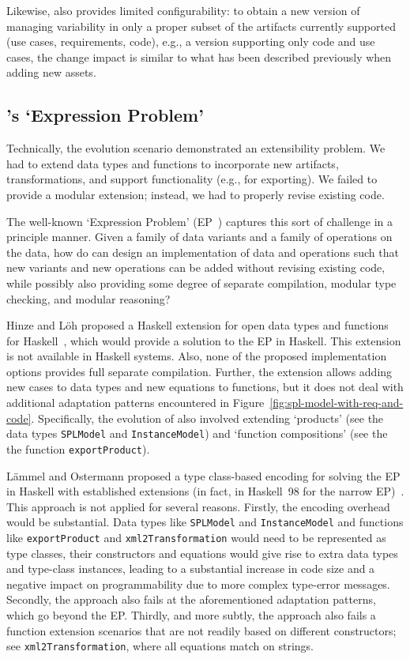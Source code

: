 Likewise, \hp{} also provides limited configurability: to obtain a new
version of \hp{} managing variability in only a proper subset of the
artifacts currently supported (use cases, requirements, code), e.g., a
version supporting only code and use cases, the change impact is
similar to what has been described previously when adding new assets.


\subsection{\hp's `Expression Problem'}
\label{S:xp}

Technically, the evolution scenario demonstrated an extensibility
problem. We had to extend data types and functions to incorporate new
artifacts, transformations, and support functionality (e.g., for
exporting). We failed to provide a modular extension; instead, we had
to properly revise existing code.

The well-known `Expression Problem'
(EP~\cite{Wadler98,Lopez-HerrejonBC05}) captures this sort of
challenge in a principle manner. Given a family of data variants and a
family of operations on the data, how do can design an implementation
of data and operations such that new variants and new operations can
be added without revising existing code, while possibly also providing
some degree of separate compilation, modular type checking, and
modular reasoning?

Hinze and L\"oh proposed a Haskell extension for open data types and
functions for Haskell~\cite{LoehH06}, which would provide a solution
to the EP in Haskell. This extension is not available in Haskell
systems. Also, none of the proposed implementation options provides
full separate compilation. Further, the extension allows adding new
cases to data types and new equations to functions, but it does not
deal with additional adaptation patterns encountered in
Figure~\ref{fig:spl-model-with-req-and-code}. Specifically, the
evolution of \hp{} also involved extending `products' (see the data types 
\texttt{SPLModel} and \texttt{InstanceModel}) and `function
compositions' (see the the function \texttt{exportProduct}).

L\"ammel and Ostermann proposed a type class-based encoding for
solving the EP in Haskell with established extensions (in fact, in
Haskell~98 for the narrow EP)~\cite{LaemmelO06}. This approach is not
applied for several reasons. Firstly, the encoding overhead would be
substantial. Data types like \texttt{SPLModel} and
\texttt{InstanceModel} and functions like \texttt{exportProduct} and
\texttt{xml2Transformation} would need to be represented as type
classes, their constructors and equations would give rise to extra
data types and type-class instances, leading to a substantial increase
in code size and a negative impact on programmability due to more
complex type-error messages. Secondly, the approach also fails at the
aforementioned adaptation patterns, which go beyond the EP. Thirdly,
and more subtly, the approach also fails a function extension
scenarios that are not readily based on different constructors; see 
\texttt{xml2Transformation}, where all equations match on strings.

